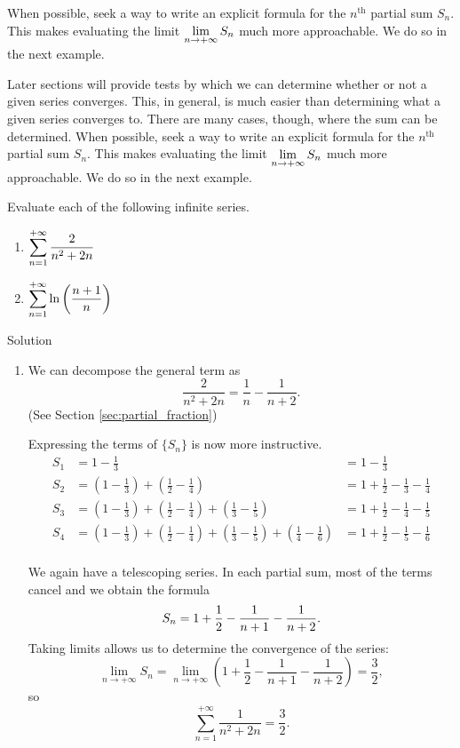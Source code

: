 When possible, seek a way to write an explicit formula for the $n^\text{th}$ partial sum $S_n$. This makes evaluating the limit $\displaystyle\lim_{n\to+\infty} S_n$ much more approachable. We do so in the next example.


\fi


\ifcalculus
Later sections will provide tests by which we can determine whether or not a given series converges. This, in general, is much easier than determining what a given series converges to. There are many cases, though, where the sum can be determined. When possible, seek a way to write an explicit formula for the $n^\text{th}$ partial sum $S_n$. This makes evaluating the limit $\displaystyle\lim_{n\to+\infty} S_n$ much more approachable. We do so in the next example.
\fi



\begin{example}\label{ex_series4}
Evaluate each of the following infinite series.
\begin{multicols}{2}
\begin{enumerate}
\item$\displaystyle \sum_{n=1}^{+\infty}\frac{2}{n^2+2n}$ 
\item $\displaystyle \sum_{n=1}^{+\infty} \ln\left(\frac{n+1}{n}\right)$
\end{enumerate}
\end{multicols}

Solution 

\begin{enumerate}
\item		We can decompose the general term as $$\frac2{n^2+2n} = \frac1n-\frac1{n+2}.$$ (See Section \ref{sec:partial_fraction})

Expressing the terms of $\{S_n\}$ is now more instructive.
\begin{align*}
S_1 &= 1-\frac13 &= 1-\frac13\\
S_2 &= \left(1-\frac13\right) + \left(\frac12-\frac14\right) &= 1+\frac12-\frac13-\frac14\\
S_3 &= \left(1-\frac13\right) + \left(\frac12-\frac14\right)+\left(\frac13-\frac15\right) &= 1+\frac12-\frac14-\frac15\\
S_4 &= \left(1-\frac13\right) + \left(\frac12-\frac14\right)+\left(\frac13-\frac15\right)+\left(\frac14-\frac16\right) &= 1+\frac12-\frac15-\frac16\\
\end{align*}
\normalsize


\ifanalysis We again have a telescoping series. \fi In each partial sum, most of the terms cancel and we obtain the formula
$$\displaystyle S_n = 1+\frac12-\frac1{n+1}-\frac1{n+2}.$$
Taking limits allows us to determine the convergence of the series:
$$\lim_{n\to+\infty}S_n = \lim_{n\to+\infty} \left(1+\frac12-\frac1{n+1}-\frac1{n+2}\right) = \frac32,$$
so
$$
\sum_{n=1}^{+\infty} \frac1{n^2+2n} = \frac32.$$


\end{enumerate}
\end{example}
